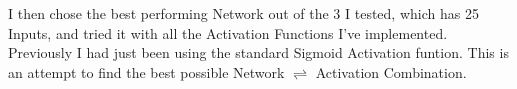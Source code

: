 \begin{flushleft}
        \begin{figure}[H]
            \centering
            \qquad
        \end{figure}

        I then chose the best performing Network out of the 3 I tested, which has 25 Inputs, and tried it with all the Activation Functions I've implemented. Previously
        I had just been using the standard Sigmoid Activation funtion. This is an attempt to find the best possible Network $\rightleftharpoons$ Activation Combination.


\end{flushleft}
